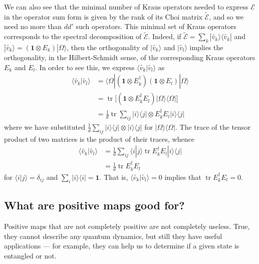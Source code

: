 \documentclass[fleqn]{article}
\begin{document}
We can also see that the minimal number of Kraus operators needed to express \(\mathcal{E}\) in the operator sum form is given by the rank of its Choi matrix \(\widetilde{\mathcal{E}}\), and so we need no more than \(dd'\) such operators.
This minimal set of Kraus operators corresponds to the spectral decomposition of \(\widetilde{\mathcal{E}}\).
Indeed, if \(\widetilde{\mathcal{E}}=\sum_k |\widetilde{v_k}\rangle\langle\widetilde{v_k}|\) and \(|\widetilde{v_k}\rangle = (\mathbf{1}\otimes E_k)|\Omega\rangle\), then the orthogonality of \(|\widetilde{v_k}\rangle\) and \(|\widetilde{v_l}\rangle\) implies the orthogonality, in the Hilbert-Schmidt sense, of the corresponding Kraus operators \(E_k\) and \(E_l\).
In order to see this, we express \(\langle\widetilde{v_k}|\widetilde{v_l}\rangle\) as
\[
  \begin{aligned}
    \langle\widetilde{v_k} |\widetilde{v_l}\rangle
    &= \langle\Omega| ( \mathbf{1}\otimes E_k^\dagger)(\mathbf{1}\otimes E_l)|\Omega\rangle
  \\&= \operatorname{tr}\big[(\mathbf{1}\otimes E_k^\dagger E_l)|\Omega\rangle\langle\Omega|\big]
  \\&= \frac{1}{d} \operatorname{tr}\sum_{ij} |i\rangle\langle j|\otimes E_k^\dagger E_l |i\rangle\langle j|
  \end{aligned}
\]
where we have substituted \(\frac{1}{d}\sum_{ij}|i\rangle\langle j|\otimes|i\rangle\langle j|\) for \(|\Omega\rangle\langle\Omega|\).
The trace of the tensor product of two matrices is the product of their traces, whence
\[
  \begin{aligned}
    \langle\widetilde{v_k}|\widetilde{v_l}\rangle
    &= \frac{1}{d}\sum_{ij} \langle i|j\rangle \operatorname{tr}E_k^\dagger E_l |i\rangle\langle j|
  \\&= \frac{1}{d} \operatorname{tr}E_k^\dagger E_l
  \end{aligned}
\]
for \(\langle i|j\rangle=\delta_{ij}\) and \(\sum_i|i\rangle\langle i|=\mathbf{1}\).
That is, \(\langle\widetilde{v_k}|\widetilde{v_l}\rangle=0\) implies that \(\operatorname{tr}E_k^\dagger E_l=0\).

\hypertarget{what-are-positive-maps-good-for}{%
\subsection{What are positive maps good for?}\label{what-are-positive-maps-good-for}}

Positive maps that are not completely positive are not completely useless.
True, they cannot describe any quantum dynamics, but still they have useful applications --- for example, they can help us to determine if a given state is entangled or not.
\end{document}
